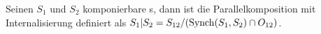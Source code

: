 \begin{frame}
  \begin{Def}
    Seinen $S_1$ und $S_2$ komponierbare \EIO{}s, dann ist die
    Parallelkomposition mit Internalisierung definiert als $S_1|S_2 = S_{12}/(
    \mathrm{Synch}(S_1,S_2) \cap O_{12})$.
  \end{Def}
\end{frame}
